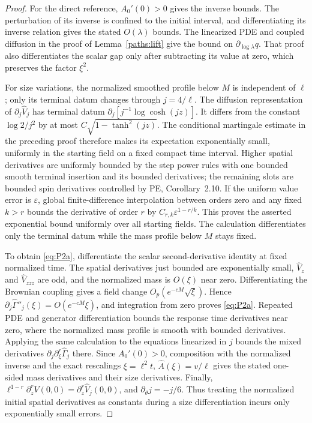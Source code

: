 \begin{proof}
For the direct reference, \(A_0'(0)>0\) gives the inverse bounds.
The perturbation of its inverse is confined to the initial interval,
and differentiating its inverse relation gives the stated
\(O(\lambda)\) bounds. The linearized PDE and coupled diffusion in
the proof of Lemma~\ref{paths:lift} give the bound on
\(\partial_{\log\lambda}q\). That proof also differentiates the
scalar gap only after subtracting its value at zero, which preserves
the factor \(\xi^2\).

For size variations, the normalized smoothed profile below \(M\) is
independent of \(\ell\); only its terminal datum changes through
\(j=4/\ell\). The diffusion representation of
\(\partial_j\widehat V_j\) has terminal datum
\(\partial_j[j^{-1}\log\cosh(jz)]\). It differs from the constant
\(\log2/j^2\) by at most
\(C\sqrt{1-\tanh^2(jz)}\). The conditional martingale estimate in
the preceding proof therefore makes its expectation exponentially
small, uniformly in the starting field on a fixed compact time interval.
Higher spatial derivatives are uniformly bounded by the step power rules with one
bounded smooth terminal insertion and its bounded derivatives; the
remaining slots are bounded spin derivatives controlled by PE,
Corollary~2.10. If the uniform value error is \(\varepsilon\), global
finite-difference interpolation between orders zero and any fixed
\(k>r\) bounds the derivative of order \(r\) by
\(C_{r,k}\varepsilon^{1-r/k}\). This proves the asserted exponential
bound uniformly over all starting fields. The calculation differentiates
only the terminal datum while the mass profile below \(M\) stays fixed.

To obtain \eqref{eq:P2a}, differentiate the scalar second-derivative
identity at fixed normalized time. The spatial derivatives just bounded
are exponentially small, \(\widehat V_z\) and
\(\widehat V_{zzz}\) are odd, and the normalized mass is \(O(\xi)\)
near zero. Differentiating the Brownian coupling gives a field change
\(O_p(e^{-cM}\sqrt\xi)\). Hence
\(\partial_j\widehat\Gamma''_j(\xi)=O(e^{-cM}\xi)\), and
integration from zero proves \eqref{eq:P2a}.
Repeated PDE and generator differentiation bounds the response time
derivatives near zero, where the normalized mass profile is smooth with
bounded derivatives. Applying the same calculation to the equations
linearized in \(j\) bounds the mixed derivatives
\(\partial_j\partial_\xi^r\widehat\Gamma_j\) there. Since
\(A_0'(0)>0\), composition with the
normalized inverse and the exact rescalings
\(\xi=\ell^2t\), \(\widehat A(\xi)=v/\ell\) gives the stated
one-sided mass derivatives and their size derivatives. Finally,
\(\ell^{1-r}\partial_z^r V(0,0)=\partial_z^r\widehat V_j(0,0)\),
and \(\partial_\theta j=-j/6\). Thus treating the normalized initial
spatial derivatives as constants during a size differentiation incurs
only exponentially small errors.


\end{proof}
